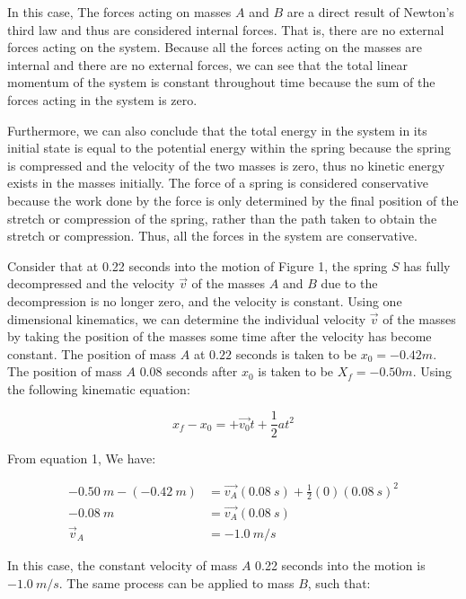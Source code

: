 \documentclass[12pt]{article}
\begin{document}
In this case, The forces acting on masses $A$ and $B$ are a direct result of Newton's third law and thus are considered internal forces. That is, there are no external forces acting on the system. Because all the forces acting on the masses are internal and there are no external forces, we can see that the total linear momentum of the system is constant throughout time because the sum of the forces acting in the system is zero.

Furthermore, we can also conclude that the total energy in the system in its initial state is equal to the potential energy within the spring because the spring is compressed and the velocity of the two masses is zero, thus no kinetic energy exists in the masses initially. The force of a spring is considered conservative because the work done by the force is only determined by the final position of the stretch or compression of the spring, rather than the path taken to obtain the stretch or compression. Thus, all the forces in the system are conservative.

\newpage

Consider that at 0.22 seconds into the motion of Figure 1, the spring $S$ has fully decompressed and the velocity $\vec{v}$ of the masses $A$ and $B$ due to the decompression is no longer zero, and the velocity is constant. Using one dimensional kinematics, we can determine the individual velocity $\vec{v}$ of the masses by taking the position of the masses some time after the velocity has become constant. The position of mass $A$ at $0.22$ seconds is taken to be $x_0 = -0.42 m$. The position of mass $A$ $0.08$ seconds after $x_0$ is taken to be $X_f = -0.50m$. Using the following kinematic equation:

\begin{equation} \label{eq1}
    x_f - x_0= + \vec{v_0}t + \frac{1}{2}at^2
\end{equation}

From equation 1, We have:

\begin{equation*}
    \begin{split}
        \SI{-0.50}{m} - (\SI{-0.42}{m}) & = \vec{v_A}(\SI{0.08}{s}) + \frac{1}{2}(0)(\SI{0.08}{s})^2 \\
        \SI{-0.08}{m} & = \vec{v_A}(\SI{0.08}{s}) \\
        \vec{v}_A & = \SI{-1.0}{m/s}
    \end{split}
\end{equation*}

In this case, the constant velocity of mass $A$ 0.22 seconds into the motion is $\SI{-1.0}{m/s}$. The same process can be applied to mass $B$, such that:
\end{document}

